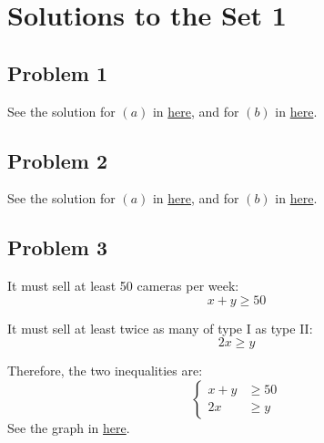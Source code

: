 \documentclass[12pt]{article}
\begin{document}
\newpage
\section*{Solutions to the Set 1}
\subsection*{Problem 1}
See the solution for \((a)\) in \href{https://www.desmos.com/calculator/gprmyamv3v}{here}, and for \((b)\) in \href{https://www.desmos.com/calculator/tab5i4blid}{here}.
\subsection*{Problem 2}
See the solution for \((a)\) in \href{https://www.desmos.com/calculator/i4y7nlqmw9}{here}, and for \((b)\) in \href{https://www.desmos.com/calculator/ufjpe021nr}{here}.

\subsection*{Problem 3}
It must sell at least 50 cameras per week:
\[
x + y \geq 50
\]

It must sell at least twice as many of type I as type II:
\[
2x \geq y
\]

Therefore, the two inequalities are:
\[
\left\{
\begin{aligned}
x + y &\geq 50 \\
2x &\geq y
\end{aligned}
\right.
\]
See the graph in \href{https://www.desmos.com/calculator/tttrsi9oqp}{here}.
\end{document}
